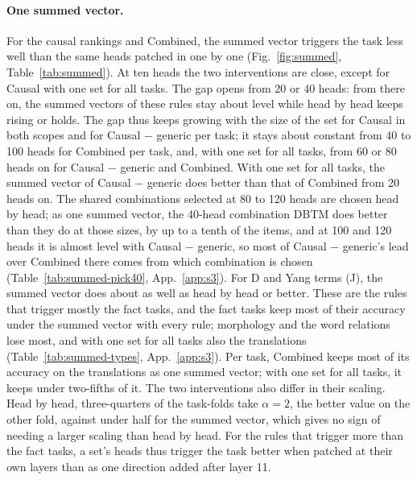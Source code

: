 \documentclass[10pt,a4paper]{article}
\begin{document}
\begin{table}[tbp]
\centering\footnotesize\setlength{\tabcolsep}{4pt}

\caption{Accuracy of every rule with the means of the three test formats: the sets of Sec.~\ref{sec:rules}, identified on Yang et al.'s five templates (tr., transfer), and the rules re-identified on the three identification formats (re-id.) (Fig.~\ref{fig:examples}). --: the rule does not fill the size on every task. Random sets and control means are in Table~\ref{tab:s3-controls-examples}.}
\label{tab:examples}
\end{table}

\paragraph{One summed vector.} For the causal rankings and Combined, the summed vector triggers the task less well than the same heads patched in one by one (Fig.~\ref{fig:summed}, Table~\ref{tab:summed}). At ten heads the two interventions are close, except for Causal with one set for all tasks. The gap opens from 20 or 40 heads: from there on, the summed vectors of these rules stay about level while head by head keeps rising or holds. The gap thus keeps growing with the size of the set for Causal in both scopes and for Causal $-$ generic per task; it stays about constant from 40 to 100 heads for Combined per task, and, with one set for all tasks, from 60 or 80 heads on for Causal $-$ generic and Combined. With one set for all tasks, the summed vector of Causal $-$ generic does better than that of Combined from 20 heads on. The shared combinations selected at 80 to 120 heads are chosen head by head; as one summed vector, the 40-head combination DBTM does better than they do at those sizes, by up to a tenth of the items, and at 100 and 120 heads it is almost level with Causal $-$ generic, so most of Causal $-$ generic's lead over Combined there comes from which combination is chosen (Table~\ref{tab:summed-pick40}, App.~\ref{app:s3}). For D and Yang terms (J), the summed vector does about as well as head by head or better. These are the rules that trigger mostly the fact tasks, and the fact tasks keep most of their accuracy under the summed vector with every rule; morphology and the word relations lose most, and with one set for all tasks also the translations (Table~\ref{tab:summed-types}, App.~\ref{app:s3}). Per task, Combined keeps most of its accuracy on the translations as one summed vector; with one set for all tasks, it keeps under two-fifths of it. The two interventions also differ in their scaling. Head by head, three-quarters of the task-folds take $\alpha=2$, the better value on the other fold, against under half for the summed vector, which gives no sign of needing a larger scaling than head by head. For the rules that trigger more than the fact tasks, a set's heads thus trigger the task better when patched at their own layers than as one direction added after layer 11.
\end{document}
